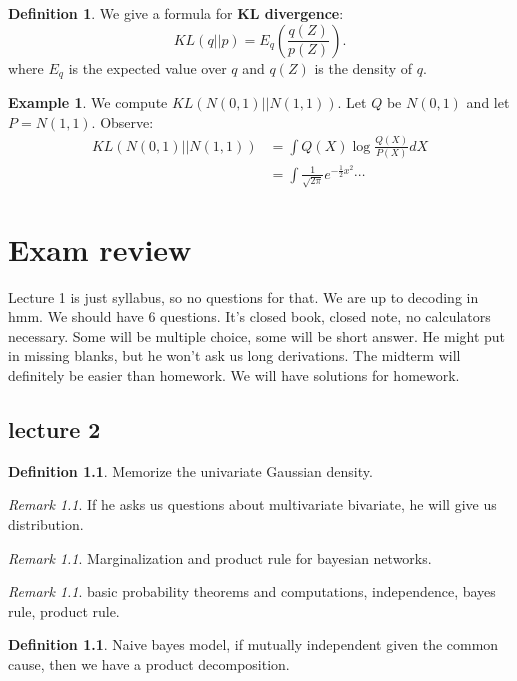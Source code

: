 \documentclass{amsbook}
\theoremstyle{plain}
\numberwithin{section}{chapter}
\numberwithin{equation}{chapter}
\theoremstyle{definition}
\newtheorem{Def}[theorem]{Definition}
\newtheorem{Ex}[theorem]{Example}
\theoremstyle{remark}
\newtheorem{rem}[theorem]{Remark}
\newcommand{\bee}{\begin{equation}\begin{aligned}}
\newcommand{\eee}{\end{aligned}\end{equation}}
\newcommand{\fracc}{\frac}
\newcommand{\lpar}{\left(}
\newcommand{\rpar}{\right)}
\begin{document}
\begin{Def}
We give a formula for \textbf{KL divergence}:
$$
KL(q||p) = E_q\lpar \fracc{q(Z)}{p(Z)} \rpar. 
$$
where $E_q$ is the expected value over $q$ and $q(Z)$ is the density of $q$. 
\end{Def}

\begin{Ex}
We compute $KL(N(0,1)||N(1,1))$. Let $Q$ be $N(0,1)$ and let $P = N(1,1)$. Observe: 
\bee
KL(N(0,1)||N(1,1)) &= \int Q(X) \log \fracc{Q(X)}{P(X)}dX\\
&=\int \fracc{1}{\sqrt{2\pi}}e^{-\fracc{1}{2}x^2}\cdots
\eee
\end{Ex}





 
\chapter{Exam review}

Lecture 1 is just syllabus, so no questions for that. We are up to decoding in hmm. We should have 6 questions. It's closed book, closed note, no calculators necessary. Some will be multiple choice, some will be short answer. He might put in missing blanks, but he won't ask us long derivations. The midterm will definitely be easier than homework. We will have solutions for homework. 

\section{lecture 2}
\begin{Def}
Memorize the univariate Gaussian density. 
\end{Def}

\begin{rem}
If he asks us questions about multivariate bivariate, he will give us distribution. 
\end{rem}

\begin{rem}
Marginalization and product rule for bayesian networks. 
\end{rem}

\begin{rem}
basic probability theorems and computations, independence, bayes rule, product rule. 
\end{rem}

\begin{Def}
Naive bayes model, if mutually independent given the common cause, then we have a product decomposition. 

\end{Def}
\end{document}
